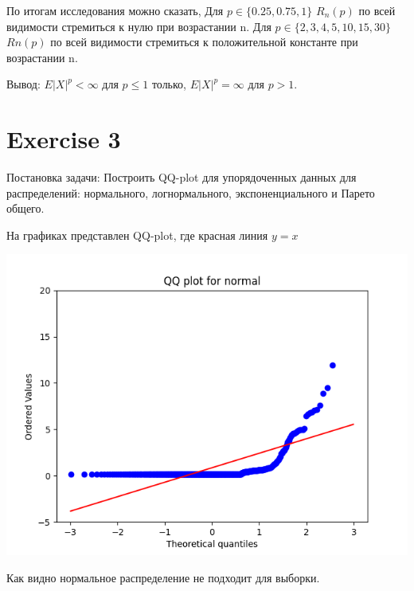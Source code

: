 \documentclass[reprint, amsmath, amssymb, aps,]{revtex4-2}
\begin{document}
По итогам исследования можно сказать, 
Для $p \in \lbrace 0.25, 0.75, 1 \rbrace $ $R_{n}(p)$ по всей видимости стремиться к нулю при возрастании n.
Для $p \in \lbrace 2, 3, 4, 5, 10, 15, 30 \rbrace $ $ Rn(p)$ по всей видимости стремиться к положительной константе при возрастании n.

Вывод: $E|X|^{p} < \infty$ для $p \leqslant 1$ только, $E|X|^{p} = \infty$ для $p > 1$.


\section{Exercise 3}
Постановка задачи:
Построить QQ-plot для упорядоченных данных для распределений: нормального, логнормального, экспоненциального и Парето общего.

На графиках представлен QQ-plot, где красная линия $y=x$

\begin{center}
\centering 
\includegraphics[scale=0.6]{Exercise31.png}
\end{center}
Как видно нормальное распределение не подходит для выборки.
\end{document}
